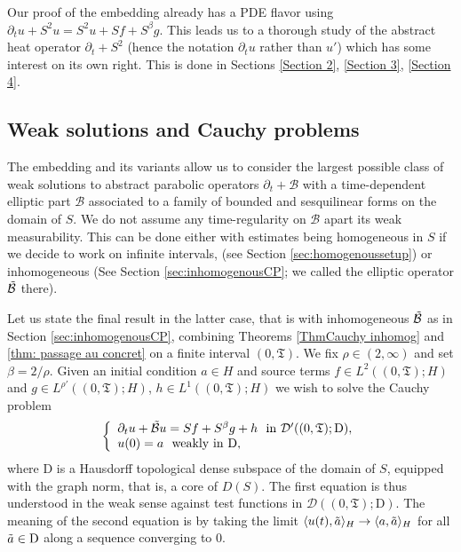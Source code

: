 \documentclass[11pt, letterpaper]{amsart}
\theoremstyle{definition}
\theoremstyle{remark}
\numberwithin{equation}{section}
\begin{document}
 Our proof of the embedding already has a  PDE flavor using 
$\partial_t u+S^2u=S^2u+Sf+S^\beta g$. This leads us to a thorough study of the abstract heat operator $\partial_t +S^2$ (hence the notation $\partial_tu$  rather than $u'$) which has some interest on its own right. This is done in Sections \ref{Section 2}, \ref{Section 3}, \ref{Section 4}.

\subsection{Weak solutions and Cauchy problems}
The embedding and its variants allow us to consider the largest possible class of weak solutions to abstract parabolic operators $\partial_{t}+\mathcal{B}$ with 
a time-dependent elliptic part $\mathcal{B}$ associated to a family of bounded and sesquilinear forms on the domain of  $S$. We do not assume any time-regularity on $\mathcal{B}$ apart its weak measurability. This can be done either with estimates being homogeneous  in $S$ if we decide to work on infinite intervals,   
(see Section \ref{sec:homogenoussetup}) or  inhomogeneous  (See Section \ref{sec:inhomogenousCP};  we called the elliptic operator $\Tilde{\mathcal{B}}$ there).
 

Let us state the final result in the latter case, that is with inhomogeneous $\Tilde{\mathcal{B}}$ as in Section \ref{sec:inhomogenousCP}, combining Theorems \ref{ThmCauchy inhomog} and \ref{thm: passage au concret} on a finite interval $(0,\mathfrak{T})$.   We fix $\rho \in (2,\infty)$ and set $\beta={2}/{\rho}$. Given an initial condition $a\in H$ and  source terms $f  \in L^2((0,\mathfrak{T});H)$ and $g \in L^{\rho'}((0,\mathfrak{T});H)$, $h\in L^{1}((0,\mathfrak{T});H)$ we wish to solve  the Cauchy problem 
\begin{align}\label{eq:Cauchy inhomogeneintro}
\left\{
    \begin{array}{ll}
        \partial_t u +\Tilde{\mathcal{B}}u =  S{f}+  S^\beta {g} + h  \ \ \mathrm{in} \ \mathcal{D}'((0,\mathfrak{T}); \mathrm{D}), \\
        u(0)=a \ \ \mathrm{weakly \ in} \ \mathrm{D},
    \end{array}
\right.
\end{align}
where $ \mathrm{D}$ is a Hausdorff topological dense subspace of the domain of $S$, equipped with the graph norm, that is, a core of $D(S)$. The first equation is thus understood in the weak sense against test functions in $\mathcal{D}((0,\mathfrak{T}); \mathrm{D})$. The meaning of the second equation is by taking the limit  $\langle u(t), \Tilde{a}\rangle_{H}\rightarrow \langle a, \Tilde{a}\rangle_{H}$ for all $\Tilde{a}\in \mathrm{D}$ along a sequence converging to 0.
\end{document}
